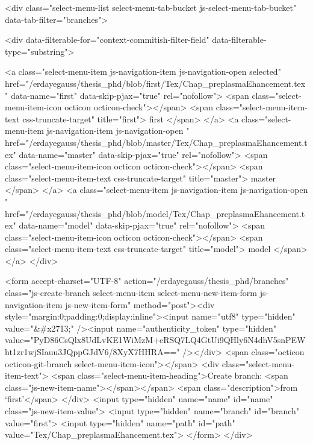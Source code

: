       <div class="select-menu-list select-menu-tab-bucket js-select-menu-tab-bucket" data-tab-filter="branches">

        <div data-filterable-for="context-commitish-filter-field" data-filterable-type="substring">


            <a class="select-menu-item js-navigation-item js-navigation-open selected"
               href="/erdayegauss/thesis_phd/blob/first/Tex/Chap_preplasmaEhancement.tex"
               data-name="first"
               data-skip-pjax="true"
               rel="nofollow">
              <span class="select-menu-item-icon octicon octicon-check"></span>
              <span class="select-menu-item-text css-truncate-target" title="first">
                first
              </span>
            </a>
            <a class="select-menu-item js-navigation-item js-navigation-open "
               href="/erdayegauss/thesis_phd/blob/master/Tex/Chap_preplasmaEhancement.tex"
               data-name="master"
               data-skip-pjax="true"
               rel="nofollow">
              <span class="select-menu-item-icon octicon octicon-check"></span>
              <span class="select-menu-item-text css-truncate-target" title="master">
                master
              </span>
            </a>
            <a class="select-menu-item js-navigation-item js-navigation-open "
               href="/erdayegauss/thesis_phd/blob/model/Tex/Chap_preplasmaEhancement.tex"
               data-name="model"
               data-skip-pjax="true"
               rel="nofollow">
              <span class="select-menu-item-icon octicon octicon-check"></span>
              <span class="select-menu-item-text css-truncate-target" title="model">
                model
              </span>
            </a>
        </div>

          <form accept-charset="UTF-8" action="/erdayegauss/thesis_phd/branches" class="js-create-branch select-menu-item select-menu-new-item-form js-navigation-item js-new-item-form" method="post"><div style="margin:0;padding:0;display:inline"><input name="utf8" type="hidden" value="&#x2713;" /><input name="authenticity_token" type="hidden" value="PyD86CsQlx8UdLvKE1WiMzM+eRSQ7LQ4GtUi9QHly6N4dhV5snPEWht1zr1wjSIauu3JQppGJdV6/8XyX7HHRA==" /></div>
            <span class="octicon octicon-git-branch select-menu-item-icon"></span>
            <div class="select-menu-item-text">
              <span class="select-menu-item-heading">Create branch: <span class="js-new-item-name"></span></span>
              <span class="description">from ‘first’</span>
            </div>
            <input type="hidden" name="name" id="name" class="js-new-item-value">
            <input type="hidden" name="branch" id="branch" value="first">
            <input type="hidden" name="path" id="path" value="Tex/Chap_preplasmaEhancement.tex">
</form>
      </div>

